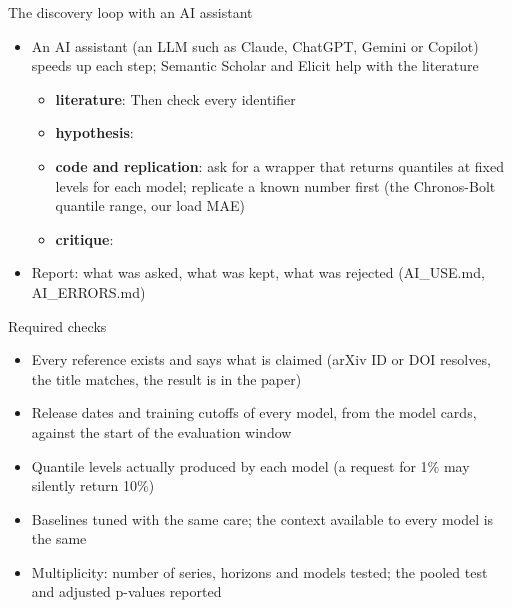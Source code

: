\begin{frame}{The discovery loop with an AI assistant}
\itemsize{\footnotesize}
\begin{itemize}
    \item An AI assistant (an LLM such as Claude, ChatGPT, Gemini or Copilot) speeds up each step; Semantic Scholar and Elicit help with the literature
    \begin{itemize}
        \item \textbf{literature}:  Then check every identifier
        \item \textbf{hypothesis}: 
        \item \textbf{code and replication}: ask for a wrapper that returns quantiles at fixed levels for each model; replicate a known number first (the Chronos-Bolt quantile range, our load MAE)
        \item \textbf{critique}: 
    \end{itemize}
    \item Report: what was asked, what was kept, what was rejected (AI\_USE.md, AI\_ERRORS.md)
\end{itemize}
\end{frame}

\begin{frame}{Required checks}
\itemsize{\small}
\begin{itemize}
    \item Every reference exists and says what is claimed (arXiv ID or DOI resolves, the title matches, the result is in the paper)
    \item Release dates and training cutoffs of every model, from the model cards, against the start of the evaluation window
    \item Quantile levels actually produced by each model (a request for 1\% may silently return 10\%)
    \item Baselines tuned with the same care; the context available to every model is the same
    \item Multiplicity: number of series, horizons and models tested; the pooled test and adjusted p-values reported
\end{itemize}
\end{frame}

